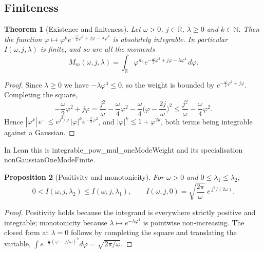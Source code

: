 \documentclass[11pt,a4paper]{article}
\theoremstyle{plain}
\newtheorem{theorem}{Theorem}[section]
\newtheorem{proposition}[theorem]{Proposition}
\theoremstyle{definition}
\theoremstyle{remark}
\newcommand{\R}{\mathbb{R}}
\newcommand{\N}{\mathbb{N}}
\let\leanoldunderscore\_
\newcommand{\leanbreakunderscore}{\leanoldunderscore\allowbreak}
\newcommand{\lean}[1]{{\ttfamily\hyphenchar\font=-1\relax
  \let\_\leanbreakunderscore #1}}
\begin{document}
\subsection{Finiteness}

\begin{theorem}[Existence and finiteness]
\label{thm:finite}
Let $\omega>0$, $j\in\R$, $\lambda\ge0$ and $k\in\N$. Then the function
$\varphi\mapsto\varphi^{k}e^{-\frac{\omega}{2}\varphi^{2}+j\varphi-\lambda\varphi^{4}}$ is
absolutely integrable. In particular $I(\omega,j,\lambda)$ is finite, and so are all the
moments
\begin{equation}
\label{eq:moments}
M_m(\omega,j,\lambda)=\int_\R \varphi^{m}\,
e^{-\frac{\omega}{2}\varphi^{2}+j\varphi-\lambda\varphi^{4}}\,d\varphi .
\end{equation}
\end{theorem}

\begin{proof}
Since $\lambda\ge 0$ we have $-\lambda\varphi^4\le 0$, so the weight is bounded by
$e^{-\frac{\omega}{2}\varphi^{2}+j\varphi}$. Completing the square,
\[
-\frac{\omega}{2}\varphi^{2}+j\varphi
=\frac{j^{2}}{\omega}-\frac{\omega}{4}\varphi^{2}
-\frac{\omega}{4}\Big(\varphi-\frac{2j}{\omega}\Big)^{2}
\le \frac{j^{2}}{\omega}-\frac{\omega}{4}\varphi^{2}.
\]
Hence $|\varphi^{k}|\,e^{\cdots}\le e^{j^2/\omega}\,|\varphi|^{k}e^{-\frac{\omega}{4}\varphi^{2}}$,
and $|\varphi|^{k}\le 1+\varphi^{2k}$, both terms being integrable against a Gaussian.
\end{proof}

In Lean this is \lean{integrable\_pow\_mul\_oneModeWeight} and its specialisation
\lean{nonGaussianOneModeFinite}.

\begin{proposition}[Positivity and monotonicity]
\label{prop:posmono}
For $\omega>0$ and $0\le\lambda_1\le\lambda_2$,
\[
0<I(\omega,j,\lambda_2)\le I(\omega,j,\lambda_1),
\qquad
I(\omega,j,0)=\sqrt{\frac{2\pi}{\omega}}\;e^{\,j^{2}/(2\omega)} .
\]
\end{proposition}

\begin{proof}
Positivity holds because the integrand is everywhere strictly positive and integrable;
monotonicity because $\lambda\mapsto e^{-\lambda\varphi^4}$ is pointwise non-increasing.
The closed form at $\lambda=0$ follows by completing the square and translating the
variable, $\int e^{-\frac{\omega}{2}(\varphi-j/\omega)^2}d\varphi=\sqrt{2\pi/\omega}$.
\end{proof}
\end{document}
